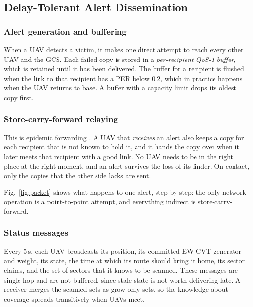 \documentclass[10pt,letterpaper]{article}
\begin{document}
\subsection{Delay-Tolerant Alert Dissemination}
\subsubsection*{Alert generation and buffering}
When a UAV detects a victim, it makes one direct attempt to reach every other UAV and the GCS. Each failed copy is stored in a \emph{per-recipient QoS-1 buffer}, which is retained until it has been delivered. The buffer for a recipient is flushed when the link to that recipient has a PER below 0.2, which in practice happens when the UAV returns to base. A buffer with a capacity limit drops its oldest copy first.

\subsubsection*{Store-carry-forward relaying}
This is epidemic forwarding \cite{vahdat2000epidemic}. A UAV that \emph{receives} an alert also keeps a copy for each recipient that is not known to hold it, and it hands the copy over when it later meets that recipient with a good link. No UAV needs to be in the right place at the right moment, and an alert survives the loss of its finder. On contact, only the copies that the other side lacks are sent.

Fig.~\ref{fig:packet} shows what happens to one alert, step by step: the only network operation is a point-to-point attempt, and everything indirect is store-carry-forward.

\subsubsection*{Status messages}
Every 5\,s, each UAV broadcasts its position, its committed EW-CVT generator and weight, its state, the time at which its route should bring it home, its sector claims, and the set of sectors that it knows to be scanned. These messages are single-hop and are not buffered, since stale state is not worth delivering late. A receiver merges the scanned sets as grow-only sets, so the knowledge about coverage spreads transitively when UAVs meet.
\end{document}
